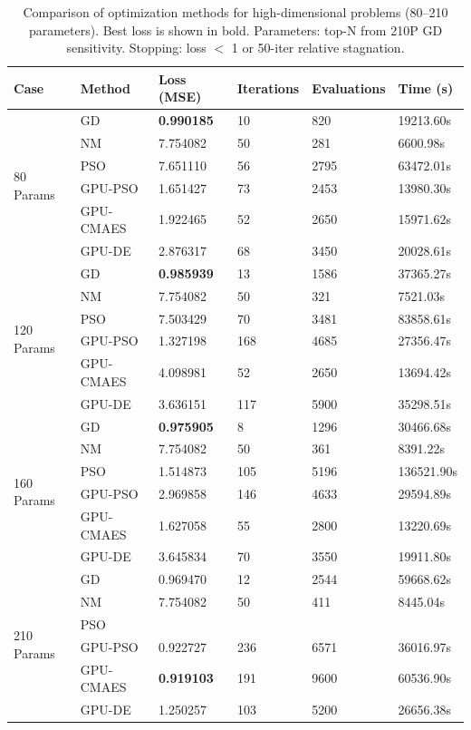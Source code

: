 \begin{table}[h!]
\centering
\caption{Comparison of optimization methods for high-dimensional problems (80--210 parameters). Best loss is shown in bold. Parameters: top-N from 210P GD sensitivity. Stopping: loss $<$ 1 or 50-iter relative stagnation.}
\label{tab:results_high}
\begin{tabular}{llllll}
\toprule
\textbf{Case} & \textbf{Method} & \textbf{Loss (MSE)} & \textbf{Iterations} & \textbf{Evaluations} & \textbf{Time (s)} \\
\midrule
 \multirow{6}{*}{80 Params} & GD           & \textbf{0.990185} & 10 & 820 & 19213.60s \\
  & NM           & 7.754082 & 50 & 281 & 6600.98s \\
  & PSO          & 7.651110 & 56 & 2795 & 63472.01s \\
  & GPU-PSO      & 1.651427 & 73 & 2453 & 13980.30s \\
  & GPU-CMAES    & 1.922465 & 52 & 2650 & 15971.62s \\
  & GPU-DE       & 2.876317 & 68 & 3450 & 20028.61s \\
\midrule
 \multirow{6}{*}{120 Params} & GD           & \textbf{0.985939} & 13 & 1586 & 37365.27s \\
  & NM           & 7.754082 & 50 & 321 & 7521.03s \\
  & PSO          & 7.503429 & 70 & 3481 & 83858.61s \\
  & GPU-PSO      & 1.327198 & 168 & 4685 & 27356.47s \\
  & GPU-CMAES    & 4.098981 & 52 & 2650 & 13694.42s \\
  & GPU-DE       & 3.636151 & 117 & 5900 & 35298.51s \\
\midrule
 \multirow{6}{*}{160 Params} & GD           & \textbf{0.975905} & 8 & 1296 & 30466.68s \\
  & NM           & 7.754082 & 50 & 361 & 8391.22s \\
  & PSO          & 1.514873 & 105 & 5196 & 136521.90s \\
  & GPU-PSO      & 2.969858 & 146 & 4633 & 29594.89s \\
  & GPU-CMAES    & 1.627058 & 55 & 2800 & 13220.69s \\
  & GPU-DE       & 3.645834 & 70 & 3550 & 19911.80s \\
\midrule
 \multirow{6}{*}{210 Params} & GD           & 0.969470 & 12 & 2544 & 59668.62s \\
  & NM           & 7.754082 & 50 & 411 & 8445.04s \\
  & PSO          &  &  &  &  \\
  & GPU-PSO      & 0.922727 & 236 & 6571 & 36016.97s \\
  & GPU-CMAES    & \textbf{0.919103} & 191 & 9600 & 60536.90s \\
  & GPU-DE       & 1.250257 & 103 & 5200 & 26656.38s \\
\bottomrule
\end{tabular}
\end{table}
